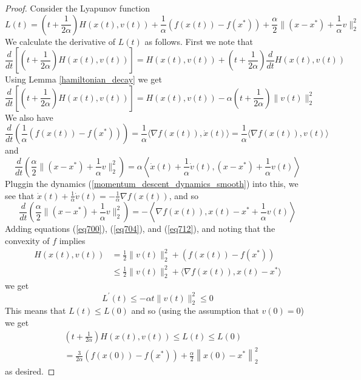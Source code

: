 \begin{proof}
 Consider the Lyapunov function
 $$
  L(t) = \left(t + \frac{1}{2\alpha}\right)H(x(t),v(t)) + \frac{1}{\alpha}(f(x(t)) - f(x^*)) + \frac{\alpha}{2}\|(x - x^*) + \frac{1}{\alpha}v\|_2^2
 $$
 We calculate the derivative of $L(t)$ as follows. First we note that
 $$
  \frac{d}{dt}\left[\left(t + \frac{1}{2\alpha}\right)H(x(t),v(t))\right] = H(x(t),v(t)) + \left(t + \frac{1}{2\alpha}\right)\frac{d}{dt}H(x(t),v(t))
 $$
 Using Lemma \ref{hamiltonian_decay} we get
 \begin{equation}\label{eq700}
  \frac{d}{dt}\left[\left(t + \frac{1}{2\alpha}\right)H(x(t),v(t))\right] = H(x(t),v(t)) - \alpha\left(t + \frac{1}{2\alpha}\right)\|v(t)\|_2^2
 \end{equation}
 We also have
 \begin{equation}\label{eq704}
  \frac{d}{dt}\left(\frac{1}{\alpha}(f(x(t)) - f(x^*))\right) = \frac{1}{\alpha}\langle\nabla f(x(t)), \dot{x}(t)\rangle = \frac{1}{\alpha}\langle\nabla f(x(t)), v(t)\rangle
 \end{equation}
 and
 $$
  \frac{d}{dt}\left(\frac{\alpha}{2}\|(x - x^*) + \frac{1}{\alpha}v\|_2^2\right) = \alpha\left\langle \dot{x}(t) + \frac{1}{\alpha}\dot{v}(t), (x - x^*) + \frac{1}{\alpha}v(t)\right\rangle
 $$
 Pluggin the dynamics (\ref{momentum_descent_dynamics_smooth}) into this, we see that $\dot{x}(t) + \frac{1}{\alpha}\dot{v}(t) = -\frac{1}{\alpha}\nabla f(x(t))$, and so
 \begin{equation}\label{eq712}
  \frac{d}{dt}\left(\frac{\alpha}{2}\|(x - x^*) + \frac{1}{\alpha}v\|_2^2\right) = -\left\langle\nabla f(x(t)), x(t) - x^* + \frac{1}{\alpha}v(t)\right\rangle
 \end{equation}
 Adding equations (\ref{eq700}), (\ref{eq704}), and (\ref{eq712}), and noting that the convexity of $f$ implies
 \begin{align}
 H(x(t),v(t)) &= \frac{1}{2}\|v(t)\|_2^2 + (f(x(t)) - f(x^*)) \\
 &\leq \frac{1}{2}\|v(t)\|_2^2 + \langle\nabla f(x(t)), x(t) - x^*\rangle
 \end{align}
 we get
 \begin{equation}
  L^\prime(t) \leq -\alpha t\|v(t)\|_2^2 \leq 0
 \end{equation}
 This means that $L(t) \leq L(0)$ and so (using the assumption that $v(0) = 0$) we get
 \begin{align}
  &\left(t + \frac{1}{2\alpha}\right)H(x(t),v(t)) \leq L(t)\leq L(0) \\
   &= \frac{3}{2\alpha}(f(x(0)) - f(x^*)) + \frac{\alpha}{2}\left\|x(0) - x^*\right\|_2^2
 \end{align}
 as desired.

\end{proof}

